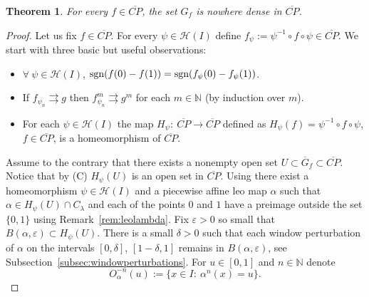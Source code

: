 \documentclass[12pt, a4paper]{amsart}
\newtheorem{theorem}{Theorem}[section]
\def\eps{\varepsilon}
\def\sgn{\mbox{\rm sgn} }
\newcommand{\?}{{\bf ???}}
\def\CP{\overline{CP}}
\begin{document}
 \begin{theorem}\label{conj-nowhere}
For every $f\in \CP$, the set $G_f$ is nowhere dense in $\CP$.
\end{theorem}

\begin{proof}Let us fix $f\in\CP$. For every $\psi\in \mathcal{H}(I)$ define $f_\psi:=\psi^{-1} \circ f \circ \psi\in \CP$. We start with three basic but useful observations:
\begin{itemize}
    \item[(A)] $\forall~\psi\in\mathcal{H}(I)$, $\sgn(f(0)-f(1))=\sgn(f_\psi(0)-f_\psi(1))$.  
    \item[(B)] If $f_{\psi_n}\rightrightarrows g$ then $f^m_{\psi_n}\rightrightarrows g^m$ for each $m\in\mathbb N$ (by induction  over $m$).
    \item[(C)] For each $\psi\in\mathcal{H}(I)$ the map $H_\psi\colon~ \CP\to \CP$ defined as $H_\psi(f)=\psi^{-1}\circ f\circ \psi$, $f\in\CP$, is a homeomorphism of $\CP$. 
 \end{itemize}
 Assume to the contrary that there exists a nonempty open set $U\subset\overline{G}_f\subset \CP$.  
  Notice that by (C) $H_{\psi}(U)$ is an open set in $\CP$.
 Using \cite[Remark p.2]{BCOT} there exist a homeomorphism $\psi \in \mathcal{H}(I)$ and a piecewise affine leo map $\alpha$ such that $\alpha\in H_\psi(U)\cap C_{\lambda}$ and each of the points $0$ and $1$ have a preimage outside the set $\{0,1\}$ using Remark~\ref{rem:leolambda}. Fix $\eps>0$ so small that $B(\alpha,\eps)\subset  H_{\psi}(U)$. There is a small $\delta >0$ such that each window perturbation of $\alpha$ on the intervals $[0,\delta]$, $[1-\delta,1]$ remains in $B(\alpha,\eps)$,  see Subsection~\ref{subsec:windowperturbations}.  For $u\in [0,1]$ and $n\in\mathbb N$ denote $$O_{\alpha}^{-n}(u):=\{x\in I\colon~ \alpha^{n}(x)=u\}.$$ 


\end{proof}
\end{document}
